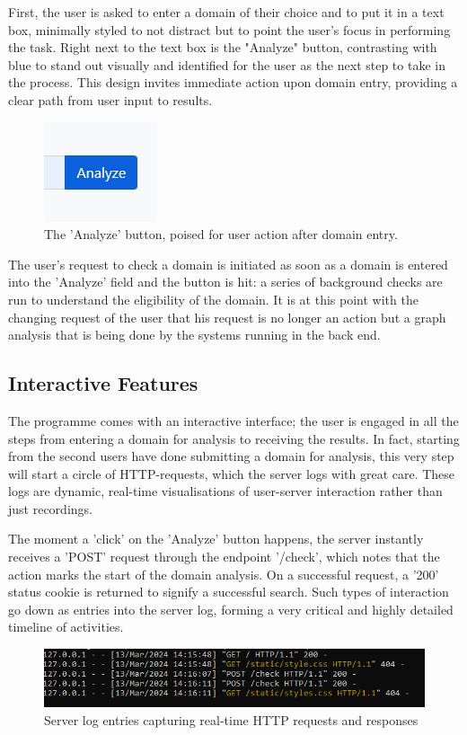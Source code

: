 First, the user is asked to enter a domain of their choice and to put it in a text box, minimally styled to not distract but to point the user's focus in performing the task. Right next to the text box is the "Analyze" button, contrasting with blue to stand out visually and identified for the user as the next step to take in the process. This design invites immediate action upon domain entry, providing a clear path from user input to results.

\begin{figure}[H]
    \centering
    \includegraphics[width=0.3\linewidth]{project/8.png}
    \caption{The 'Analyze' button, poised for user action after domain entry.}
    \label{fig:imple2222}
\end{figure}

The user's request to check a domain is initiated as soon as a domain is entered into the 'Analyze' field and the button is hit: a series of background checks are run to understand the eligibility of the domain. It is at this point with the changing request of the user that his request is no longer an action but a graph analysis that is being done by the systems running in the back end.

\subsection{Interactive Features}

The programme comes with an interactive interface; the user is engaged in all the steps from entering a domain for analysis to receiving the results. In fact, starting from the second users have done submitting a domain for analysis, this very step will start a circle of HTTP-requests, which the server logs with great care. These logs are dynamic, real-time visualisations of user-server interaction rather than just recordings.


The moment a 'click' on the 'Analyze' button happens, the server instantly receives a 'POST' request through the endpoint '/check', which notes that the action marks the start of the domain analysis. On a successful request, a '200' status cookie is returned to signify a successful search. Such types of interaction go down as entries into the server log, forming a very critical and highly detailed timeline of activities.
\begin{figure}[H]
    \centering
    \includegraphics[width=0.8\linewidth]{project/I.png}
    \caption{Server log entries capturing real-time HTTP requests and responses}
    \label{fig:imple22222}
\end{figure}

